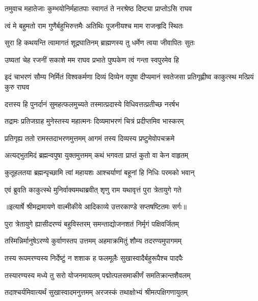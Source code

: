 \twolineshloka
{तमुवाच महातेजाः कुम्भयोनिर्महातपाः}
{स्वागतं ते नरश्रेष्ठ दिष्ट्या प्राप्तोऽसि राघव} %

\twolineshloka
{त्वं मे बहुमतो राम गुणैर्बहुभिरुत्तमैः}
{अतिथिः पूजनीयश्च माम राजन्हृदि स्थितः} %

\twolineshloka
{सुरा हि कथयन्ति त्वामागतं शूद्रघातिनम्}
{ब्राह्मणस्य तु धर्मेण त्वया जीवापितः सुतः} %

\twolineshloka
{उष्यतां चेह रजनीं सकाशे मम राघव}
{प्रभाते पुष्पकेण त्वं गन्ता स्वपुरमेव हि} %

\threelineshloka
{इदं चाभरणं सौम्य निर्मितं विश्वकर्मणा}
{दिव्यं दिव्येन वपुषा दीप्यमानं स्वतेजसा}
{प्रतिगृह्णीष्व काकुत्स्थ मत्प्रियं कुरु राघव} %

\twolineshloka
{दत्तस्य हि पुनर्दानं सुमहत्फलमुच्यते}
{तस्मात्प्रदास्ये विधिवत्तत्प्रतीच्छ नरर्षभ} %

\twolineshloka
{तद्रामः प्रतिजग्राह मुनेस्तस्य महात्मनः}
{दिव्यमाभरणं चित्रं प्रदीप्तमिव भास्करम्} %

\twolineshloka
{प्रतिगृह्य ततो रामस्तदाभरणमुत्तमम्}
{आगमं तस्य दिव्यस्य प्रष्टुमेवोपचक्रमे} %

\twolineshloka
{अत्यद्भुतमिदं ब्रह्मन्वपुषा युक्तमुत्तमम्}
{कथं भगवता प्राप्तं कुतो वा केन वाहृतम्} %

\twolineshloka
{कुतूहलतया ब्रह्मन्पृच्छामि त्वां महायशः}
{आश्चर्याणां बहूनां हि निधिः परमको भवान्} %

\twolineshloka
{एवं ब्रुवति काकुत्स्थे मुनिर्वाक्यमथाब्रवीत्}
{शृणु राम यथावृत्तं पुरा त्रेतायुगे गते} %


{॥इत्यार्षे श्रीमद्रामायणे वाल्मीकीये आदिकाव्ये उत्तरकाण्डे सप्तषष्टितमः सर्गः॥}


\twolineshloka
{पुरा त्रेतायुगे ह्यासीदरण्यं बहुविस्तरम्}
{समन्ताद्योजनशतं निर्मृगं पक्षिवर्जितम्} %

\twolineshloka
{तस्मिन्निर्मानुषेऽरण्ये कुर्वाणस्तप उत्तमम्}
{अहमाक्रमितुं शौम्य तदरण्यमुपागमम्} %

\twolineshloka
{तस्य रूपमरण्यस्य निर्देष्टुं न शशाक ह}
{फलमूलैः सुखास्वादैर्बहुरूपैश्च पादपैः} %

\twolineshloka
{तस्यारण्यस्य मध्ये तु सरो योजनमायतम्}
{पद्मोत्पलसमाकीर्णं समतिक्रान्तशैवलम्} %

\twolineshloka
{तदाश्चर्यमिवात्यर्थं सुखास्वादमनुत्तमम्}
{अरजस्कं तथाक्षोभ्यं श्रीमत्पक्षिगणायुतम्} %

